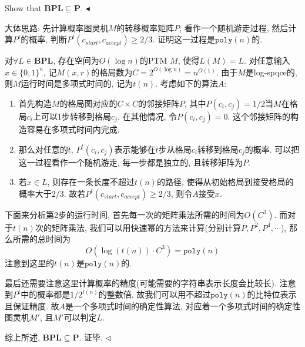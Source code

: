 \documentclass[11pt]{article}
\newcommand{\mP}{\mathbf{P}}
\newcommand{\1}{\mathbf{1}}
\newenvironment{problem}[2][Problem]{\begin{trivlist}
\item[\hskip \labelsep{\bfseries#1}\hskip\labelsep{\bfseries#2.}]}{\hfill$\blacktriangleleft$\end{trivlist}}
\newenvironment{answer}[1][Solution]{\begin{trivlist}
\item[\hskip \labelsep{\bfseries#1.}\hskip \labelsep]}{\hfill$\lhd$\end{trivlist}}
\begin{document}
\begin{problem}{5.(22 points)}
    Show that $\textbf{BPL} \subseteq \mP$.
\end{problem}
\begin{answer}
    大体思路: 先计算概率图灵机$M$的转移概率矩阵$P$, 看作一个随机游走过程, 然后计算$P^t$的概率, 判断$P^t(c_{start}, c_{accept}) \ge 2/3$. 证明这一过程是$\texttt{poly}(n)$的.  

    对$\forall L \in \mathbf{BPL}$, 存在空间为$O(\log n)$的PTM $M$, 使得$L(M) = L$. 对任意输入$x \in \{0,1\}^n$, 记$M(x, r)$的格局数为$C = 2^{O(\log n)} = n^{O(1)}$. 由于$M$是log-spqce的, 则$M$运行时间是多项式时间的, 记为$t(n)$. 考虑如下的算法$A$:
    \begin{enumerate}
        \item 首先构造$M$的格局图对应的$C\times C$的邻接矩阵$P$, 其中$P(c_i, c_j) = 1/2$当$M$在格局$c_i$上可以1步转移到格局$c_j$. 在其他情况, 令$P(c_i, c_j) = 0$. 这个邻接矩阵的构造容易在多项式时间内完成.
        \item 那么对任意的$t$, $P^t(c_i, c_j)$表示能够在$t$步从格局$c_i$转移到格局$c_j$的概率. 可以把这一过程看作一个随机游走, 每一步都是独立的, 且转移矩阵为$P$.
        \item 若$x \in L$, 则存在一条长度不超过$t(n)$的路径, 使得从初始格局到接受格局的概率大于$2/3$. 故若$P^t(c_{start}, c_{accept}) \ge 2/3$, 则令$A$接受$x$.
    \end{enumerate}
    下面来分析第2步的运行时间, 首先每一次的矩阵乘法所需的时间为$O(C^3)$. 而对于$t(n)$次的矩阵乘法, 我们可以用快速幂的方法来计算(分别计算$P, P^2, P^4, \cdots$), 那么所需的总时间为
    \[O(\log (t(n)) \cdot C^3) = \texttt{poly}(n)\]
    注意到这里的$t(n)$是$\texttt{poly}(n)$的. 

    最后还需要注意这里计算概率的精度(可能需要的字符串表示长度会比较长). 注意到$P^t$中的概率都是$1/2^{t(n)}$的整数倍, 故我们可以用不超过$\texttt{poly}(n)$的比特位表示且保证精度. 故$A$是一个多项式时间的确定性算法, 对应着一个多项式时间的确定性图灵机$M'$, 且$M'$可以判定$L$.
    
    综上所述, $\mathbf{BPL} \subseteq \mP$. 证毕. 
\end{answer}
\end{document}

